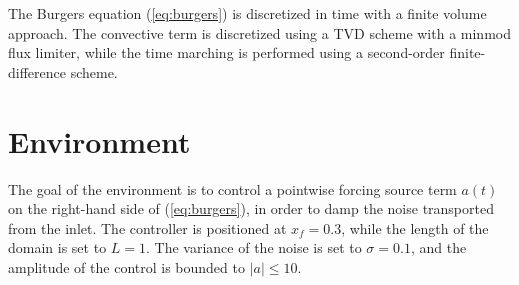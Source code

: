 The Burgers equation (\ref{eq:burgers}) is discretized in time with a finite volume approach. The convective term is discretized using a TVD scheme with a minmod flux limiter, while the time marching is performed using a second-order finite-difference scheme.

\section{Environment}

The goal of the environment is to control a pointwise forcing source term $a(t)$ on the right-hand side of (\ref{eq:burgers}), in order to damp the noise transported from the inlet. The controller is positioned at $x_f = 0.3$, while the length of the domain is set to $L=1$. The variance of the noise is set to $\sigma = 0.1$, and the amplitude of the control is bounded to $\left| a \right| \leq 10$.

